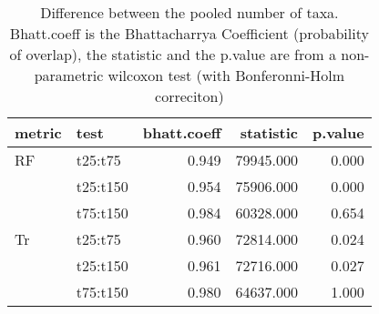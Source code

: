 \begin{table}[ht]
\centering
\begin{tabular}{llr|rr}
  \hline
metric & test & bhatt.coeff & statistic & p.value \\ 
  \hline
RF & t25:t75 & 0.949 & 79945.000 & 0.000 \\ 
   & t25:t150 & 0.954 & 75906.000 & 0.000 \\ 
   & t75:t150 & 0.984 & 60328.000 & 0.654 \\ 
  Tr & t25:t75 & 0.960 & 72814.000 & 0.024 \\ 
   & t25:t150 & 0.961 & 72716.000 & 0.027 \\ 
   & t75:t150 & 0.980 & 64637.000 & 1.000 \\ 
   \hline
\end{tabular}
\caption{Difference between the pooled number of taxa. Bhatt.coeff is the Bhattacharrya Coefficient (probability of overlap), the statistic and the p.value are from a non-parametric wilcoxon test (with Bonferonni-Holm correciton)} 
\label{Tab_pooledstaxa_test}
\end{table}
